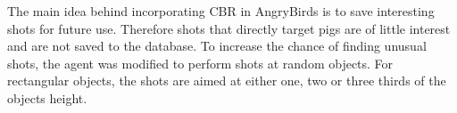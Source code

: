 The main idea behind incorporating CBR in AngryBirds is to save interesting shots for future use. Therefore shots that directly target pigs are of little interest and are not saved to the database.
To increase the chance of finding unusual shots, the agent was modified to perform shots at random objects. For rectangular objects, the shots are aimed at either one, two or three thirds of the objects height.
